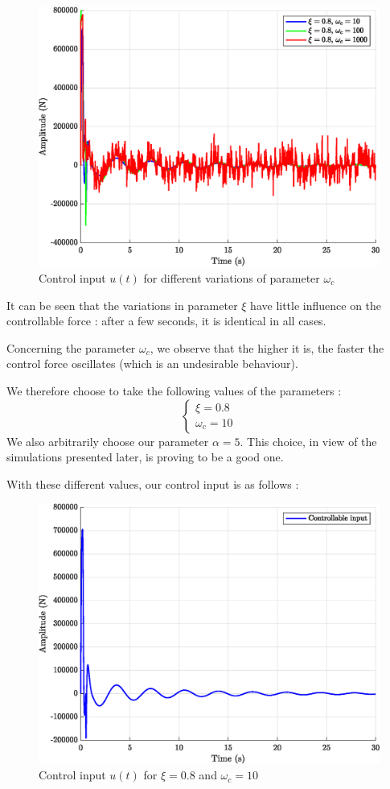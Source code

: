 \begin{figure}[H]
    \centering
    \includegraphics[width=\textwidth]{resources/eps/omega-variations.eps}
    \caption{Control input $u(t)$ for different variations of parameter $\omega_c$}
\end{figure}
It can be seen that the variations in parameter $\xi$ have little influence on the controllable force : after a few seconds, it is identical in all cases.\par
Concerning the parameter $\omega_c$, we observe that the higher it is, the faster the control force oscillates (which is an undesirable behaviour).\par
We therefore choose to take the following values of the parameters :
$$
\begin{cases}
    \xi = \num{0.8}\\
    \omega_c = \num{10}
\end{cases}
$$
We also arbitrarily choose our parameter $\alpha = 5$. This choice, in view of the simulations presented later, is proving to be a good one.\par
With these different values, our control input is as follows :
\begin{figure}[H]
    \centering
    \includegraphics[width=\textwidth]{resources/eps/controllable-input.eps}
    \caption{Control input $u(t)$ for $\xi = \num{0.8}$ and $\omega_c = \num{10}$}
\end{figure}
